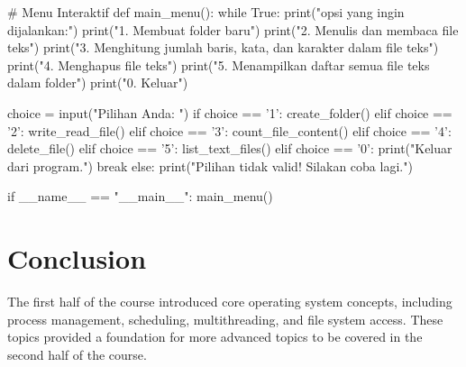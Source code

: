 \documentclass[12pt]{article}
\begin{document}
\begin{python}
# Menu Interaktif
def main_menu():
    while True:
        print("\nPilih opsi yang ingin dijalankan:")
        print("1. Membuat folder baru")
        print("2. Menulis dan membaca file teks")
        print("3. Menghitung jumlah baris, kata, dan karakter dalam file teks")
        print("4. Menghapus file teks")
        print("5. Menampilkan daftar semua file teks dalam folder")
        print("0. Keluar")
        
        choice = input("Pilihan Anda: ")
        if choice == '1':
            create_folder()
        elif choice == '2':
            write_read_file()
        elif choice == '3':
            count_file_content()
        elif choice == '4':
            delete_file()
        elif choice == '5':
            list_text_files()
        elif choice == '0':
            print("Keluar dari program.")
            break
        else:
            print("Pilihan tidak valid! Silakan coba lagi.")

if __name__ == "__main__":
    main_menu()

\end{python}


\section{Conclusion}
The first half of the course introduced core operating system concepts, including process management, scheduling, multithreading, and file system access. These topics provided a foundation for more advanced topics to be covered in the second half of the course.
\end{document}
